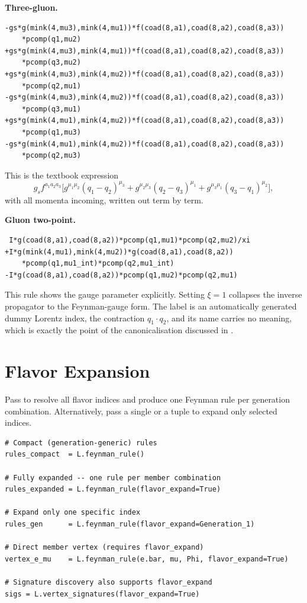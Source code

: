 \noindent\textbf{Three-gluon.}
\begin{verbatim}
-gs*g(mink(4,mu3),mink(4,mu1))*f(coad(8,a1),coad(8,a2),coad(8,a3))
    *pcomp(q1,mu2)
+gs*g(mink(4,mu3),mink(4,mu1))*f(coad(8,a1),coad(8,a2),coad(8,a3))
    *pcomp(q3,mu2)
+gs*g(mink(4,mu3),mink(4,mu2))*f(coad(8,a1),coad(8,a2),coad(8,a3))
    *pcomp(q2,mu1)
-gs*g(mink(4,mu3),mink(4,mu2))*f(coad(8,a1),coad(8,a2),coad(8,a3))
    *pcomp(q3,mu1)
+gs*g(mink(4,mu1),mink(4,mu2))*f(coad(8,a1),coad(8,a2),coad(8,a3))
    *pcomp(q1,mu3)
-gs*g(mink(4,mu1),mink(4,mu2))*f(coad(8,a1),coad(8,a2),coad(8,a3))
    *pcomp(q2,mu3)
\end{verbatim}
\noindent This is the textbook expression
\begin{equation}
    g_s f^{a_1a_2a_3}\Big[
      g^{\mu_1\mu_2}(q_1-q_2)^{\mu_3}
    + g^{\mu_2\mu_3}(q_2-q_3)^{\mu_1}
    + g^{\mu_3\mu_1}(q_3-q_1)^{\mu_2}\Big],
\end{equation}
with all momenta incoming, written out term by term.

\noindent\textbf{Gluon two-point.}
\begin{verbatim}
 I*g(coad(8,a1),coad(8,a2))*pcomp(q1,mu1)*pcomp(q2,mu2)/xi
+I*g(mink(4,mu1),mink(4,mu2))*g(coad(8,a1),coad(8,a2))
    *pcomp(q1,mu1_int)*pcomp(q2,mu1_int)
-I*g(coad(8,a1),coad(8,a2))*pcomp(q1,mu2)*pcomp(q2,mu1)
\end{verbatim}
\noindent This rule shows the gauge parameter explicitly. Setting $\xi=1$
collapses the inverse propagator to the Feynman-gauge form. The label
 is an automatically generated dummy Lorentz
index, the contraction $q_1\!\cdot\!q_2$, and its name carries no
meaning, which is exactly the point of the canonicalisation discussed in
.

\section{Flavor Expansion}
\label{sec:feynpy-flavor-expand}

Pass  to resolve all flavor indices and produce
one Feynman rule per generation combination.  Alternatively, pass a
single  or a tuple to expand only selected indices.

\begin{verbatim}
# Compact (generation-generic) rules
rules_compact  = L.feynman_rule()

# Fully expanded -- one rule per member combination
rules_expanded = L.feynman_rule(flavor_expand=True)

# Expand only one specific index
rules_gen      = L.feynman_rule(flavor_expand=Generation_1)

# Direct member vertex (requires flavor_expand)
vertex_e_mu    = L.feynman_rule(e.bar, mu, Phi, flavor_expand=True)

# Signature discovery also supports flavor_expand
sigs = L.vertex_signatures(flavor_expand=True)
\end{verbatim}

